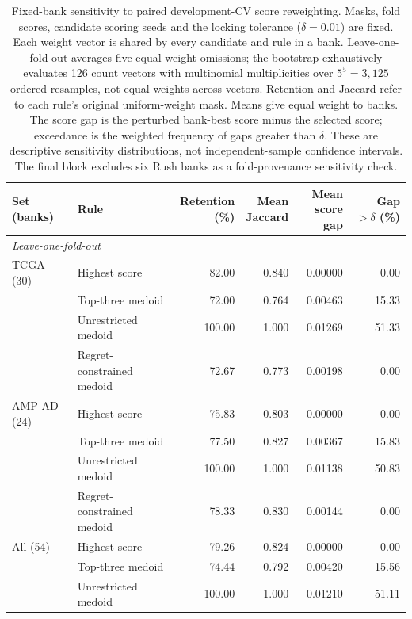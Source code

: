 \begin{table}[p]
\centering
\small
\caption{Fixed-bank sensitivity to paired development-CV score reweighting. Masks, fold scores, candidate scoring seeds and the locking tolerance ($\delta=0.01$) are fixed. Each weight vector is shared by every candidate and rule in a bank. Leave-one-fold-out averages five equal-weight omissions; the bootstrap exhaustively evaluates 126 count vectors with multinomial multiplicities over $5^5=3{,}125$ ordered resamples, not equal weights across vectors. Retention and Jaccard refer to each rule's original uniform-weight mask. Means give equal weight to banks. The score gap is the perturbed bank-best score minus the selected score; exceedance is the weighted frequency of gaps greater than $\delta$. These are descriptive sensitivity distributions, not independent-sample confidence intervals. The final block excludes six Rush banks as a fold-provenance sensitivity check.}
\label{tab:supp29}
\setlength{\tabcolsep}{4pt}
\renewcommand{\arraystretch}{1.04}
\begin{tabular}{llrrrr}
\hline
Set (banks) & Rule & \shortstack{Retention\\(\%)} & \shortstack{Mean\\Jaccard} & \shortstack{Mean\\score gap} & \shortstack{Gap $>\delta$\\(\%)} \\
\hline
\multicolumn{6}{l}{\textit{Leave-one-fold-out}} \\
TCGA (30) & Highest score & 82.00 & 0.840 & 0.00000 & 0.00 \\
 & Top-three medoid & 72.00 & 0.764 & 0.00463 & 15.33 \\
 & Unrestricted medoid & 100.00 & 1.000 & 0.01269 & 51.33 \\
 & Regret-constrained medoid & 72.67 & 0.773 & 0.00198 & 0.00 \\
AMP-AD (24) & Highest score & 75.83 & 0.803 & 0.00000 & 0.00 \\
 & Top-three medoid & 77.50 & 0.827 & 0.00367 & 15.83 \\
 & Unrestricted medoid & 100.00 & 1.000 & 0.01138 & 50.83 \\
 & Regret-constrained medoid & 78.33 & 0.830 & 0.00144 & 0.00 \\
All (54) & Highest score & 79.26 & 0.824 & 0.00000 & 0.00 \\
 & Top-three medoid & 74.44 & 0.792 & 0.00420 & 15.56 \\
 & Unrestricted medoid & 100.00 & 1.000 & 0.01210 & 51.11 \\

\end{tabular}
\end{table}
